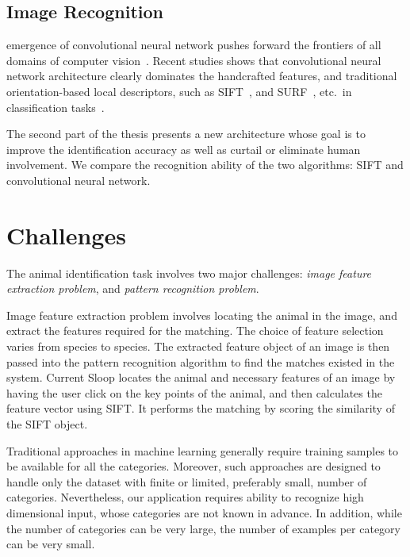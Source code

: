 \subsection{Image Recognition} %
emergence of convolutional neural network pushes forward the frontiers of all
domains of computer vision~\cite{lecun95}. Recent studies shows that
convolutional neural network architecture clearly dominates the handcrafted
features, and traditional orientation-based local descriptors, such as
SIFT~\cite{lowe04}, and SURF~\cite{surf08}, etc.\ in classification
tasks~\cite{fisher14,kriz12,prelu15,ILSVRC15}.

The second part of the thesis presents a new architecture whose goal is to
improve the identification accuracy as well as curtail or eliminate human
involvement. We compare the recognition ability of the two algorithms: SIFT and
convolutional neural network. 

\section{Challenges}

The animal identification task involves two major challenges: \emph{image
feature extraction problem}, and \emph{pattern recognition problem}. 

Image feature extraction problem involves locating the animal in the image, and
extract the features required for the matching. The choice of feature selection
varies from species to species. The extracted feature object of an image is then
passed into the pattern recognition algorithm to find the matches existed in the
system. Current Sloop locates the animal and necessary features of an image by
having the user click on the key points of the animal, and then calculates the
feature vector using SIFT\@. It performs the matching by scoring the similarity of
the SIFT object. 

Traditional approaches in machine learning generally require training samples to
be available for all the categories. Moreover, such approaches are designed to
handle only the dataset with finite or limited, preferably small, number of
categories. Nevertheless, our application requires ability to recognize high
dimensional input, whose categories are not known in advance. In addition, while
the number of categories can be very large, the number of examples per category
can be very small.

